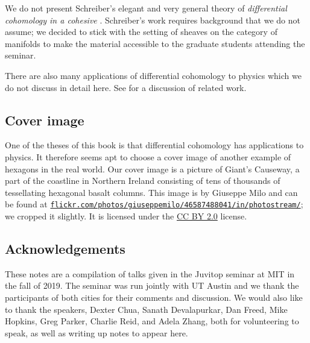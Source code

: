 We do not present Schreiber's elegant and very general theory of \textit{differential cohomology in a cohesive \topos} \cite{Urs}.
Schreiber's work requires background that we do not assume; we decided to stick with the setting of sheaves on the category of manifolds to make the material accessible to the graduate students attending the seminar.

There are also many applications of differential cohomology to physics which we do not discuss in detail here. See  for a discussion of related work. 

\subsection{Cover image}
One of the theses of this book is that differential cohomology has applications to physics. It therefore seems apt
to choose a cover image of another example of hexagons in the real world. Our cover image is a picture of Giant's
Causeway, a part of the coastline in Northern Ireland consisting of tens of thousands of tessellating hexagonal
basalt columns. This image is by Giuseppe Milo and can be found at
\href{https://www.flickr.com/photos/giuseppemilo/46587488041/in/photostream/}{\nolinkurl{flickr.com/photos/giuseppemilo/46587488041/in/photostream/}}; we cropped it slightly. It is
licensed under the \href{https://creativecommons.org/licenses/by/2.0/}{CC BY 2.0} license.


\subsection{Acknowledgements}%

These notes are a compilation of talks given in the Juvitop seminar at MIT in the fall of 2019. 
The seminar was run jointly with UT Austin and we thank the participants of both cities for their comments and discussion. 
We would also like to thank the speakers, 
Dexter Chua, Sanath Devalapurkar, Dan Freed, Mike Hopkins, Greg Parker, Charlie Reid, and Adela Zhang,
both for volunteering to speak, as well as writing up notes to appear here. 

